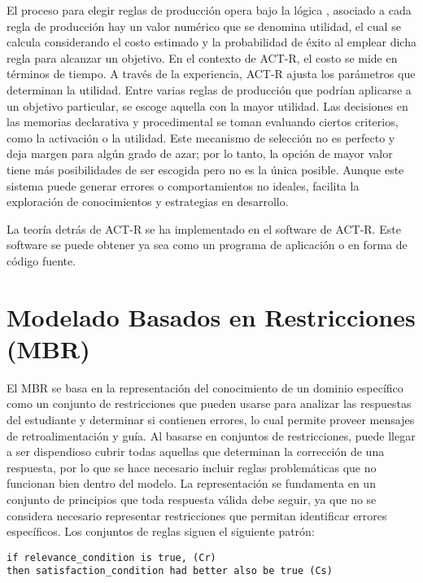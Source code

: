 El proceso para elegir reglas de producción opera bajo la lógica \cite{Taatgen2005ACT-R}, asociado a cada regla de producción hay un valor numérico que se denomina utilidad, el cual se calcula considerando el costo estimado y la probabilidad de éxito al emplear dicha regla para alcanzar un objetivo. En el contexto de ACT-R, el costo se mide en términos de tiempo. A través de la experiencia, ACT-R ajusta los parámetros que determinan la utilidad. Entre varias reglas de producción que podrían aplicarse a un objetivo particular, se escoge aquella con la mayor utilidad. Las decisiones en las memorias declarativa y procedimental se toman evaluando ciertos criterios, como la activación o la utilidad. Este mecanismo de selección no es perfecto y deja margen para algún grado de azar; por lo tanto, la opción de mayor valor tiene más posibilidades de ser escogida pero no es la única posible. Aunque este sistema puede generar errores o comportamientos no ideales, facilita la exploración de conocimientos y estrategias en desarrollo.

La teoría detrás de ACT-R se ha implementado en el software de ACT-R. Este software se puede obtener ya sea como un programa de aplicación o en forma de código fuente.

\section{Modelado Basados en Restricciones (MBR)}

El MBR se basa en la representación del conocimiento de un dominio específico como un conjunto de restricciones \cite{Mitrovic2011CBM} que pueden usarse para analizar las respuestas del estudiante y determinar si contienen errores, lo cual permite proveer mensajes de retroalimentación y guía. Al basarse en conjuntos de restricciones, puede llegar a ser dispendioso cubrir todas aquellas que determinan la corrección de una respuesta, por lo que se hace necesario incluir reglas problemáticas que no funcionan bien dentro del modelo. La representación se fundamenta en un conjunto de principios que toda respuesta válida debe seguir, ya que no se considera necesario representar restricciones que permitan identificar errores específicos. Los conjuntos de reglas siguen el siguiente patrón:

\begin{lstlisting}
if relevance_condition is true, (Cr)
then satisfaction_condition had better also be true (Cs)
\end{lstlisting}

